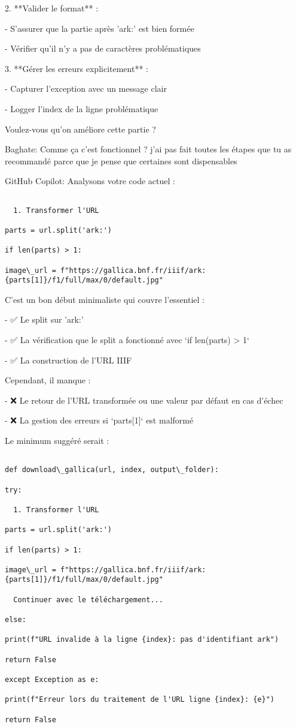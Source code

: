 2. **Valider le format** :

- S'assurer que la partie après 'ark:' est bien formée

- Vérifier qu'il n'y a pas de caractères problématiques

3. **Gérer les erreurs explicitement** :

- Capturer l'exception avec un message clair

- Logger l'index de la ligne problématique

Voulez-vous qu'on améliore cette partie ?

Baghate: Comme ça c'est fonctionnel ? j'ai pas fait toutes les étapes que tu as recommandé parce que je pense que certaines sont dispensables

GitHub Copilot: Analysons votre code actuel :

\begin{verbatim}

  1. Transformer l'URL

parts = url.split('ark:')

if len(parts) > 1:

image\_url = f"https://gallica.bnf.fr/iiif/ark:{parts[1]}/f1/full/max/0/default.jpg"

\end{verbatim}

C'est un bon début minimaliste qui couvre l'essentiel :

- ✅ Le split sur 'ark:'

- ✅ La vérification que le split a fonctionné avec `if len(parts) > 1`

- ✅ La construction de l'URL IIIF

Cependant, il manque :

- ❌ Le retour de l'URL transformée ou une valeur par défaut en cas d'échec

- ❌ La gestion des erreurs si `parts[1]` est malformé

Le minimum suggéré serait :

\begin{verbatim}

def download\_gallica(url, index, output\_folder):

try:

  1. Transformer l'URL

parts = url.split('ark:')

if len(parts) > 1:

image\_url = f"https://gallica.bnf.fr/iiif/ark:{parts[1]}/f1/full/max/0/default.jpg"

  Continuer avec le téléchargement...

else:

print(f"URL invalide à la ligne {index}: pas d'identifiant ark")

return False

except Exception as e:

print(f"Erreur lors du traitement de l'URL ligne {index}: {e}")

return False

\end{verbatim}


